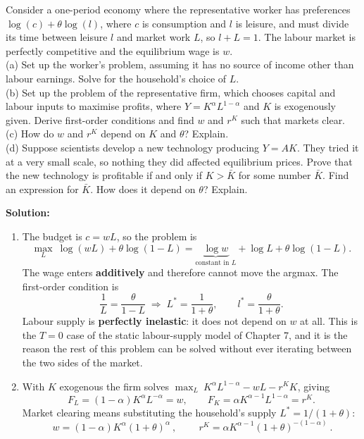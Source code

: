 \documentclass[12pt, letterpaper]{article}
\newcommand{\stst}{^{\ast}}
\begin{document}
\begin{tcolorbox}[evenbox,title={Problem 9.8 \quad A New Technology}]
\begin{tcolorbox}[questionbox]
Consider a one-period economy where the representative worker has preferences
$\log(c)+\theta\log(l)$, where $c$ is consumption and $l$ is leisure, and must divide its
time between leisure $l$ and market work $L$, so $l+L=1$. The labour market is perfectly
competitive and the equilibrium wage is $w$.\\[3pt]
(a) Set up the worker's problem, assuming it has no source of income other than labour
earnings. Solve for the household's choice of $L$.\\
(b) Set up the problem of the representative firm, which chooses capital and labour inputs
to maximise profits, where $Y=K^\alpha L^{1-\alpha}$ and $K$ is exogenously given. Derive
first-order conditions and find $w$ and $r^K$ such that markets clear.\\
(c) How do $w$ and $r^K$ depend on $K$ and $\theta$? Explain.\\
(d) Suppose scientists develop a new technology producing $Y=AK$. They tried it at a very
small scale, so nothing they did affected equilibrium prices. Prove that the new technology
is profitable if and only if $K>\bar K$ for some number $\bar K$. Find an expression for
$\bar K$. How does it depend on $\theta$? Explain.
\end{tcolorbox}

\textbf{Solution:}

\begin{enumerate}
\item The budget is $c=wL$, so the problem is
\[
\max_{L}\ \log(wL)+\theta\log(1-L)
=\underbrace{\log w}_{\text{constant in }L}+\log L+\theta\log(1-L).
\]
The wage enters \textbf{additively} and therefore cannot move the argmax. The first-order
condition is
\[
\frac{1}{L}=\frac{\theta}{1-L}
\;\Longrightarrow\;
\boxed{L\stst=\frac{1}{1+\theta}},\qquad l\stst=\frac{\theta}{1+\theta} .
\]
Labour supply is \textbf{perfectly inelastic}: it does not depend on $w$ at all. This is the
$T=0$ case of the static labour-supply model of Chapter 7, and it is the reason the rest of
this problem can be solved without ever iterating between the two sides of the market.

\item With $K$ exogenous the firm solves $\max_{L}\ K^\alpha L^{1-\alpha}-wL-r^KK$, giving
\[
F_L=(1-\alpha)K^\alpha L^{-\alpha}=w,
\qquad
F_K=\alpha K^{\alpha-1}L^{1-\alpha}=r^K .
\]
Market clearing means substituting the household's supply $L\stst=1/(1+\theta)$:
\[
\boxed{\ w=(1-\alpha)K^{\alpha}(1+\theta)^{\alpha}\ },
\qquad
\boxed{\ r^K=\alpha K^{\alpha-1}(1+\theta)^{-(1-\alpha)}\ }.
\]


\end{enumerate}
\end{tcolorbox}
\end{document}
